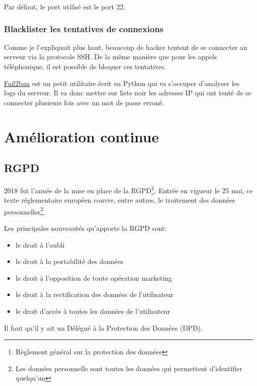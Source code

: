 \documentclass[]{report}
\begin{document}
      Par défaut, le port utilisé est le port 22.


    \subsection{Blacklister les tentatives de connexions}

      Comme je l'expliquait plus haut, beaucoup de hacker tentent de se connecter au serveur via la protocole SSH. De la même manière que pour les appels téléphonique, il est possible de bloquer ces tentatives.

       \href{https://www.fail2ban.org/wiki/index.php/Main_Page}{Fail2ban} est un petit utilitaire écrit en Python qui va s’occuper d'analyser les logs du serveur. Il va donc mettre sur liste noir les adresses IP qui ont tenté de se connecter plusieurs fois avec un mot de passe erroné.




\chapter{Amélioration continue}

  \section{RGPD}

    2018 fut l'année de la mise en place de la RGPD\footnote{Règlement général sur la protection des données}. Entrée en vigueur le 25 mai, ce texte réglementaire européen couvre, entre autres, le traitement des données personnelles\footnote{Les données personnelle sont toutes les données qui permettent d'identifier quelqu'un}.

    Les principales nouveautés qu'apporte la RGPD sont:

    \begin{itemize}
      \item le droit à l'oubli
      \item le droit à la portabilité des données
      \item le droit à l'opposition de toute opération marketing
      \item le droit à la rectification des données de l'utilisateur
      \item le droit d'accès à toutes les données de l'utilisateur
    \end{itemize}

    Il faut qu'il y ait un Délégué à la Protection des Données (DPD).
\end{document}
